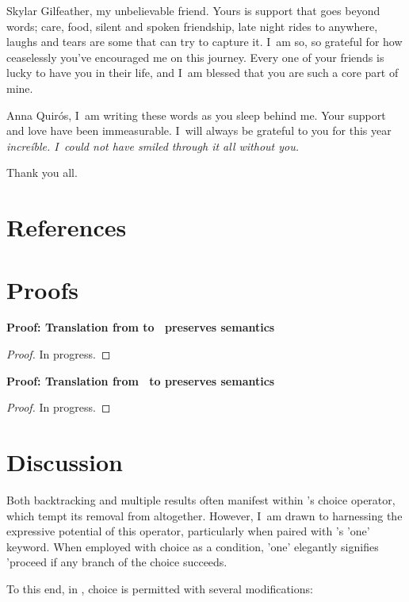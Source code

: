 \documentclass[manuscript,screen,review, 12pt, nonacm]{acmart}
\begin{document}
Skylar Gilfeather, my unbelievable friend. Yours is support that goes
beyond words; care, food, silent and spoken friendship, late night rides to
anywhere, laughs and tears are some that can try to capture it. I~am so, so
grateful for how ceaselessly you've encouraged me on this journey. Every one
of your friends is lucky to have you in their life, and I~am blessed that 
you are such a core part of mine. 

Anna Quirós, I~am writing these words as you sleep behind me. Your support
and love have been immeasurable. I~will always be grateful to you for this
year \it{increíble}. I~could not have smiled through it all without you. 

Thank you all. 

\section{References}


\renewcommand\thesection{\Alph{section}}
\setcounter{section}{0}
\section{Proofs}
\begin{outline}
\1 \bf{Proof: Translation from \VMinus to \D\ preserves semantics }
\begin{proof}
  In progress. 
\end{proof}
\1 \bf{Proof: Translation from \PPlus\ to \VMinus preserves semantics }
\begin{proof}
  In progress. 
\end{proof}
\end{outline}

\section{Discussion}

Both backtracking and multiple results often manifest within \VC's choice
operator, which tempt its removal from \VMinus altogether. However, I~am drawn
to harnessing the expressive potential of this operator, particularly when
paired with \VC's 'one' keyword. When employed with choice as a condition, 'one'
elegantly signifies 'proceed if any branch of the choice succeeds. 

To this end, in \VMinus, choice is permitted with several modifications:
\end{document}

